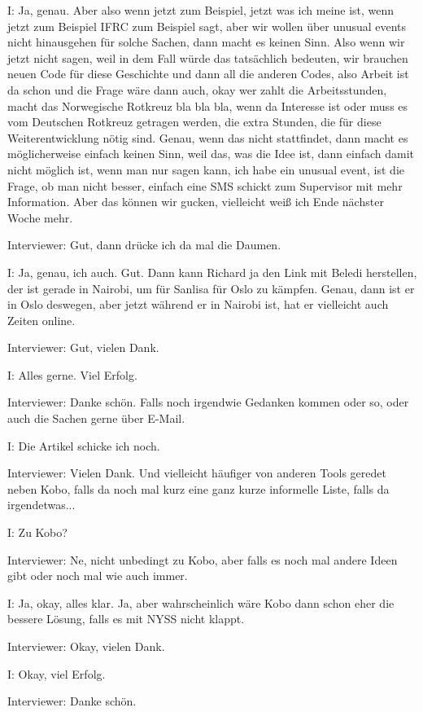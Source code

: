 I: Ja, genau. Aber also wenn jetzt zum Beispiel, jetzt was ich meine ist, wenn jetzt zum Beispiel IFRC zum Beispiel sagt, aber wir wollen über unusual events nicht hinausgehen für solche Sachen, dann macht es keinen Sinn. Also wenn wir jetzt nicht sagen, weil in dem Fall würde das tatsächlich bedeuten, wir brauchen neuen Code für diese Geschichte und dann all die anderen Codes, also Arbeit ist da schon und die Frage wäre dann auch, okay wer zahlt die Arbeitsstunden, macht das Norwegische Rotkreuz bla bla bla, wenn da Interesse ist oder muss es vom Deutschen Rotkreuz getragen werden, die extra Stunden, die für diese Weiterentwicklung nötig sind. Genau, wenn das nicht stattfindet, dann macht es möglicherweise einfach keinen Sinn, weil das, was die Idee ist, dann einfach damit nicht möglich ist, wenn man nur sagen kann, ich habe ein unusual event, ist die Frage, ob man nicht besser, einfach eine SMS schickt zum Supervisor mit mehr Information. Aber das können wir gucken, vielleicht weiß ich  Ende nächster Woche mehr. 

Interviewer: Gut, dann drücke ich da mal die Daumen. 

I: Ja, genau, ich auch. Gut. Dann kann Richard ja den Link mit Beledi herstellen, der ist gerade in Nairobi, um für Sanlisa für Oslo zu kämpfen. Genau, dann ist er in Oslo deswegen, aber jetzt während er in Nairobi ist, hat er vielleicht auch Zeiten online. 

Interviewer: Gut, vielen Dank. 

I: Alles gerne. Viel Erfolg. 

Interviewer: Danke schön. Falls noch irgendwie Gedanken kommen oder so, oder auch die Sachen gerne über E-Mail. 

I: Die Artikel schicke ich noch. 

Interviewer: Vielen Dank. Und vielleicht häufiger von anderen Tools geredet neben Kobo, falls da noch mal kurz eine ganz kurze informelle Liste, falls da irgendetwas... 

I: Zu Kobo? 

Interviewer: Ne, nicht unbedingt zu Kobo, aber falls es noch mal andere Ideen gibt oder noch mal wie auch immer. 

I: Ja, okay, alles klar. Ja, aber wahrscheinlich wäre Kobo dann schon eher die bessere Lösung, falls es mit NYSS nicht klappt. 

Interviewer: Okay, vielen Dank. 

I: Okay, viel Erfolg. 

Interviewer: Danke schön. 

